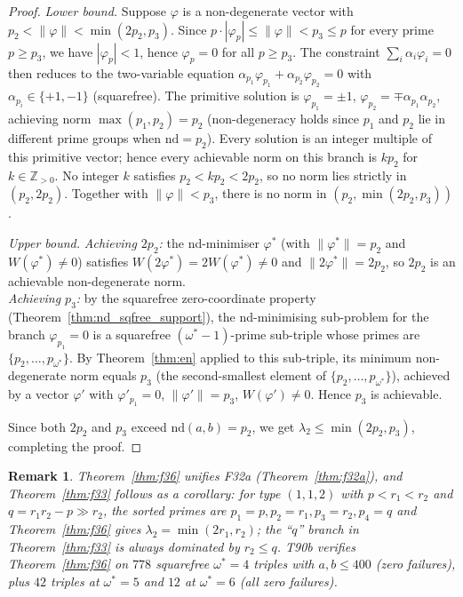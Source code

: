 \documentclass[12pt]{article}
\newtheorem{remark}{Remark}
\theoremstyle{definition}
\begin{document}
\begin{proof}
  \textit{Lower bound.}
  Suppose $\varphi$ is a non-degenerate vector with $p_2 < \|\varphi\| < \min(2p_2, p_3)$.
  Since $p \cdot |\varphi_p| \le \|\varphi\| < p_3 \le p$ for every prime $p \ge p_3$,
  we have $|\varphi_p| < 1$, hence $\varphi_p = 0$ for all $p \ge p_3$.
  The constraint $\sum_i \alpha_i \varphi_i = 0$ then reduces to the two-variable
  equation $\alpha_{p_1}\varphi_{p_1} + \alpha_{p_2}\varphi_{p_2} = 0$
  with $\alpha_{p_i} \in \{+1,-1\}$ (squarefree).
  The primitive solution is $\varphi_{p_1} = \pm 1$, $\varphi_{p_2} = \mp\alpha_{p_1}\alpha_{p_2}$,
  achieving norm $\max(p_1, p_2) = p_2$ (non-degeneracy holds since $p_1$ and $p_2$
  lie in different prime groups when $\mathrm{nd} = p_2$).
  Every solution is an integer multiple of this primitive vector; hence every
  achievable norm on this branch is $k p_2$ for $k \in \mathbb{Z}_{>0}$.
  No integer $k$ satisfies $p_2 < k p_2 < 2p_2$, so no norm lies strictly
  in $(p_2, 2p_2)$.  Together with $\|\varphi\| < p_3$, there is no norm in
  $(p_2, \min(2p_2,p_3))$.

  \textit{Upper bound.}
  \textit{Achieving $2p_2$:} the nd-minimiser $\varphi^*$ (with $\|\varphi^*\| = p_2$ and
  $W(\varphi^*) \ne 0$) satisfies $W(2\varphi^*) = 2W(\varphi^*) \ne 0$ and
  $\|2\varphi^*\| = 2p_2$, so $2p_2$ is an achievable non-degenerate norm. \\
  \textit{Achieving $p_3$:} by the squarefree zero-coordinate property
  (Theorem~\ref{thm:nd_sqfree_support}), the nd-minimising sub-problem for the branch
  $\varphi_{p_1} = 0$ is a squarefree $(\omega^*-1)$-prime sub-triple whose
  primes are $\{p_2,\ldots,p_{\omega^*}\}$.  By Theorem~\ref{thm:en} applied to
  this sub-triple, its minimum non-degenerate norm equals $p_3$
  (the second-smallest element of $\{p_2,\ldots,p_{\omega^*}\}$), achieved by
  a vector $\varphi'$ with $\varphi'_{p_1}=0$, $\|\varphi'\|=p_3$, $W(\varphi')\ne 0$.
  Hence $p_3$ is achievable.

  Since both $2p_2$ and $p_3$ exceed $\mathrm{nd}(a,b) = p_2$, we get
  $\lambda_2 \le \min(2p_2,p_3)$, completing the proof.
\end{proof}

\begin{remark}
  Theorem~\ref{thm:f36} unifies F32a (Theorem~\ref{thm:f32a}), and
  Theorem~\ref{thm:f33} follows as a corollary: for type $(1,1,2)$ with
  $p < r_1 < r_2$ and $q = r_1 r_2 - p \gg r_2$, the sorted primes are
  $p_1=p, p_2=r_1, p_3=r_2, p_4=q$ and Theorem~\ref{thm:f36} gives
  $\lambda_2 = \min(2r_1, r_2)$; the ``$q$'' branch in Theorem~\ref{thm:f33}
  is always dominated by $r_2 \le q$.
  T90b verifies Theorem~\ref{thm:f36} on $778$ squarefree $\omega^*=4$ triples
  with $a,b \le 400$ (zero failures), plus $42$ triples at $\omega^*=5$ and
  $12$ at $\omega^*=6$ (all zero failures).
\end{remark}
\end{document}
